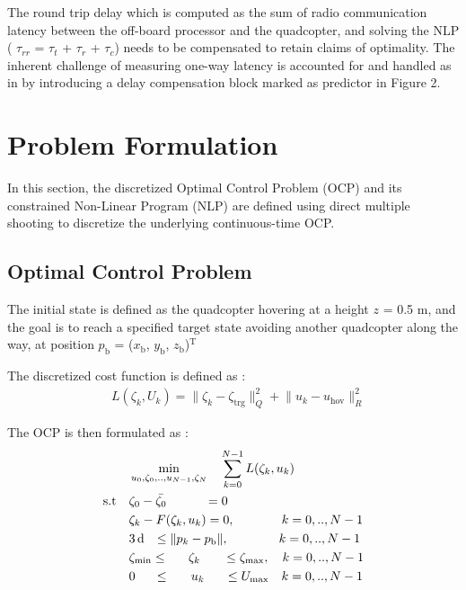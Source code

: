 \documentclass[conference]{IEEEtran}
\begin{document}
The round trip delay which is computed as the sum of radio communication latency between the off-board processor and the quadcopter, and solving the NLP ( $\tau_{rr}$ = $\tau_{t}$ + $\tau_{r}$ + $\tau_{c}$) needs to be compensated to retain claims of optimality. The inherent challenge of measuring one-way latency is accounted for and handled as in \cite{carlos_efficient_2020} by introducing a delay compensation block marked as predictor in Figure 2.

\section{Problem Formulation}\label{Section3}

In this section, the discretized Optimal Control Problem (OCP) and its constrained Non-Linear Program (NLP) are defined using direct multiple shooting \cite{bock_multiple_1984} to discretize the underlying continuous-time OCP.

\subsection{Optimal Control Problem}

The initial state is defined as the quadcopter hovering at a height $z$ = 0.5 m, and the goal is to reach a specified target state avoiding another quadcopter along the way, at position  $p_\mathrm{b}$ = ($x_\mathrm{b}$, $y_\mathrm{b}$, $z_\mathrm{b}$)$\mathrm{^{T}}$

The discretized cost function is defined as :
\begin{align}
	& L\left(\zeta_k, U_k\right) = \lVert \zeta_k - \zeta_{\mathrm{trg}} \rVert^2_Q + \lVert u_k - u_{\mathrm{hov}} \rVert^2_R
\end{align}

The OCP is then formulated as :
\begin{align}
	&\min_{u_0,\zeta_0,..,u_{N-1},\zeta_N} \quad \sum_{k = 0}^{N-1} L(\zeta_k, u_k) \\
	\text{s.t} \quad
	& \zeta_0 - \bar{\zeta_0} \hspace{0.42in} = 0\\
    & \zeta_k - F(\zeta_k, u_k) = 0, \hspace{0.1in}\quad\qquad k = 0,..,N-1 \\
    & 3\,\mathrm{d} \hspace{0.1in} \le \lVert p_k - p_{\mathrm{b}} \rVert, \qquad \qquad  k = 0,..,N-1 \\
	& \zeta_{\mathrm{min}} \le \hspace{0.22in} \zeta_k \hspace{0.25in} \le \zeta_{\mathrm{max}}, \quad k = 0,..,N-1 \\
    & 0 \hspace{0.2in} \le \hspace{0.23in} u_k \hspace{0.22in} \le U_{\mathrm{max}} \quad k = 0,..,N-1
\end{align}
\end{document}
